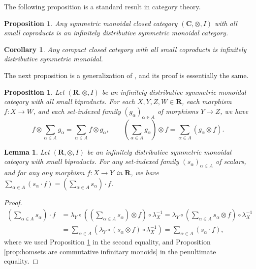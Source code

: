\documentclass[12pt]{tac}
\newtheorem{lemma}[theorem]{Lemma}
\newtheorem{proposition}[theorem]{Proposition}
\newtheorem{corollary}[theorem]{Corollary}
\theoremstyle{definition}
\theoremstyle{remark}
\newcommand{\<}{\langle}
\renewcommand{\>}{\rangle}
\renewcommand{\:}{\colon}
\begin{document}
The following proposition is a standard result in category theory. 
\begin{proposition}\label{prop:monoidalcloseddistributive}
    Any symmetric monoidal closed category $(\mathbf C,\otimes, I)$ with all small coproducts is an infinitely distributive symmetric monoidal category. 
\end{proposition}


\begin{corollary}\label{cor:compact category is distributive}
    Any compact closed category with all small coproducts is infinitely distributive symmetric monoidal.
\end{corollary}






The next proposition is a generalization of \cite[Lemma 3.22]{heunenvicary}, and its proof is essentially the same.
\begin{proposition}\label{prop:tensor is enriched over commutative infinitary monoids}
    Let $(\mathbf R,\otimes,I)$ be an infinitely distributive symmetric monoidal category with all small biproducts. For each $X,Y,Z,W\in\mathbf R$, each morphism $f:X\to W$, and each set-indexed family $(g_{\alpha})_{\alpha\in A}$ of morphisms $Y\to Z$, we have
    \[f\otimes \sum_{\alpha\in A}g_\alpha= \sum_{\alpha\in A}f\otimes g_\alpha, \qquad  \left(\sum_{\alpha\in A}g_\alpha\right)\otimes f=\sum_{\alpha\in A}(g_\alpha\otimes f).\]
        \end{proposition}



\begin{lemma}\label{lem:distributivity scalar multiplication and sums}
    Let $(\mathbf R,\otimes,I)$ be an infinitely distributive symmetric monoidal category with small biproducts. For any set-indexed family $(s_\alpha)_{\alpha\in A}$ of scalars, and for any any morphism $f:X\to Y$ in $\mathbf R$, we have $\sum_{\alpha\in A}(s_\alpha\cdot f)=\left(\sum_{\alpha\in A}s_\alpha\right)\cdot f$.
\end{lemma}
\begin{proof}
\begin{align*} \left(\sum_{\alpha\in A}s_\alpha\right)\cdot f &  = \lambda_Y\circ \left(\left(\sum_{\alpha\in A}s_\alpha\right)\otimes f\right)\circ \lambda _X^{-1}=\lambda_Y\circ \left(\sum_{\alpha\in A}s_\alpha\otimes f\right)\circ\lambda_X^{-1}\\
& =\sum_{\alpha\in A}(\lambda_Y\circ (s_\alpha\otimes f)\circ\lambda_X^{-1})=\sum_{\alpha\in A}(s_\alpha\cdot f),
\end{align*}
where we used Proposition \ref{prop:tensor is enriched over commutative infinitary monoids} in the second equality, and Proposition \ref{prop:homsets are commutative infinitary monoids} in the penultimate equality.
\end{proof}
\end{document}
